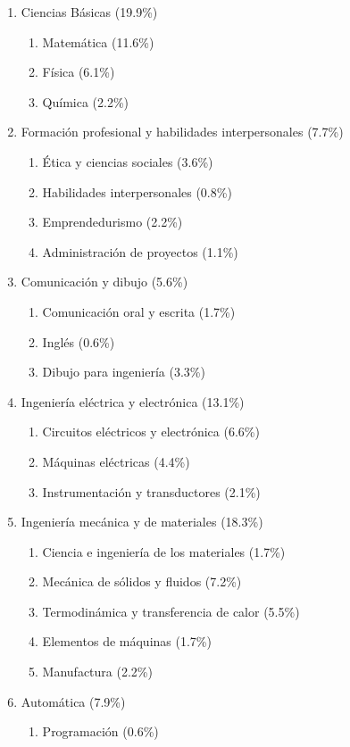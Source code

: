 \begin{enumerate}
\item Ciencias Básicas (19.9\%)
\begin{enumerate}
\item Matemática (11.6\%)
\item Física (6.1\%)
\item Química (2.2\%)
\end{enumerate}
\item Formación profesional y habilidades interpersonales (7.7\%)
\begin{enumerate}
\item Ética y ciencias sociales (3.6\%)
\item Habilidades interpersonales (0.8\%)
\item Emprendedurismo (2.2\%)
\item Administración de proyectos (1.1\%)
\end{enumerate}
\item Comunicación y dibujo (5.6\%)
\begin{enumerate}
\item Comunicación oral y escrita (1.7\%)
\item Inglés (0.6\%)
\item Dibujo para ingeniería (3.3\%)
\end{enumerate}
\item Ingeniería eléctrica y electrónica (13.1\%)
\begin{enumerate}
\item Circuitos eléctricos y electrónica (6.6\%)
\item Máquinas eléctricas (4.4\%)
\item Instrumentación y transductores (2.1\%)
\end{enumerate}
\item Ingeniería mecánica y de materiales (18.3\%)
\begin{enumerate}
\item Ciencia e ingeniería de los materiales (1.7\%)
\item Mecánica de sólidos y fluidos (7.2\%)
\item Termodinámica y transferencia de calor (5.5\%)
\item Elementos de máquinas (1.7\%)
\item Manufactura (2.2\%)
\end{enumerate}
\item Automática (7.9\%)
\begin{enumerate}
\item Programación (0.6\%)

\end{enumerate}
\end{enumerate}
